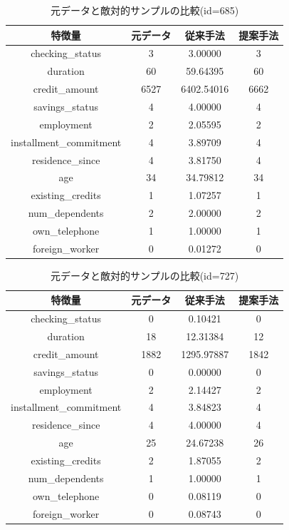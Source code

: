\begin{table}[H]
    \centering
    \caption{元データと敵対的サンプルの比較(id=685)}
    \begin{tabular}{|c|c|c|c|} \hline
        特徴量 & 元データ & 従来手法 & 提案手法 \\ \hline
        checking\_status & 3 & 3.00000 & 3 \\ \hline
        duration & 60 & 59.64395 & 60 \\ \hline
        credit\_amount & 6527 & 6402.54016 & 6662 \\ \hline
        savings\_status & 4 & 4.00000 & 4 \\ \hline
        employment & 2 & 2.05595 & 2 \\ \hline
        installment\_commitment & 4 & 3.89709 & 4 \\ \hline
        residence\_since & 4 & 3.81750 & 4 \\ \hline
        age & 34 & 34.79812 & 34 \\ \hline
        existing\_credits & 1 & 1.07257 & 1 \\ \hline
        num\_dependents & 2 & 2.00000 & 2 \\ \hline
        own\_telephone & 1 & 1.00000 & 1 \\ \hline
        foreign\_worker & 0 & 0.01272 & 0 \\ \hline
    \end{tabular}
\end{table}

\begin{table}[H]
    \centering
    \caption{元データと敵対的サンプルの比較(id=727)}
    \begin{tabular}{|c|c|c|c|} \hline
        特徴量 & 元データ & 従来手法 & 提案手法 \\ \hline
        checking\_status & 0 & 0.10421 & 0 \\ \hline
        duration & 18 & 12.31384 & 12 \\ \hline
        credit\_amount & 1882 & 1295.97887 & 1842 \\ \hline
        savings\_status & 0 & 0.00000 & 0 \\ \hline
        employment & 2 & 2.14427 & 2 \\ \hline
        installment\_commitment & 4 & 3.84823 & 4 \\ \hline
        residence\_since & 4 & 4.00000 & 4 \\ \hline
        age & 25 & 24.67238 & 26 \\ \hline
        existing\_credits & 2 & 1.87055 & 2 \\ \hline
        num\_dependents & 1 & 1.00000 & 1 \\ \hline
        own\_telephone & 0 & 0.08119 & 0 \\ \hline
        foreign\_worker & 0 & 0.08743 & 0 \\ \hline
    \end{tabular}
\end{table}

